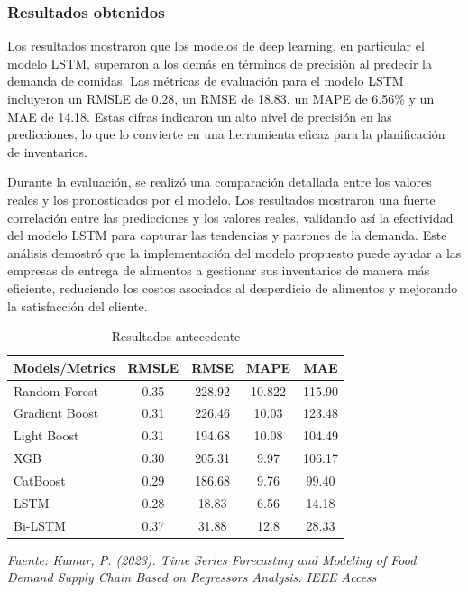 \subsubsection{Resultados obtenidos}
Los resultados mostraron que los modelos de deep learning, en particular el modelo LSTM, superaron a los demás en términos de precisión al predecir la demanda de comidas. Las métricas de evaluación para el modelo LSTM incluyeron un RMSLE de 0.28, un RMSE de 18.83, un MAPE de 6.56\% y un MAE de 14.18. Estas cifras indicaron un alto nivel de precisión en las predicciones, lo que lo convierte en una herramienta eficaz para la planificación de inventarios.

Durante la evaluación, se realizó una comparación detallada entre los valores reales y los pronosticados por el modelo. Los resultados mostraron una fuerte correlación entre las predicciones y los valores reales, validando así la efectividad del modelo LSTM para capturar las tendencias y patrones de la demanda. Este análisis demostró que la implementación del modelo propuesto puede ayudar a las empresas de entrega de alimentos a gestionar sus inventarios de manera más eficiente, reduciendo los costos asociados al desperdicio de alimentos y mejorando la satisfacción del cliente.

\begin{table}[h!]
	\centering
	\begin{tabular}{lcccc}
		\hline
		Models/Metrics & RMSLE & RMSE & MAPE & MAE \\ \hline
		 Random Forest & 0.35 &  228.92 & 10.822 & 115.90 \\
		 Gradient Boost & 0.31 & 226.46 & 10.03 & 123.48 \\
		 Light Boost & 0.31 & 194.68 & 10.08 & 104.49 \\
		 XGB & 0.30 & 205.31 & 9.97 & 106.17\\
		 CatBoost & 0.29 & 186.68 & 9.76 & 99.40 \\
		 LSTM & 0.28 & 18.83 & 6.56 & 14.18 \\
		 Bi-LSTM & 0.37 & 31.88 & 12.8 & 28.33 \\ \hline
		
	\end{tabular}
	\caption{Resultados antecedente}
	\textit{Fuente: Kumar, P. (2023). Time Series Forecasting and Modeling of Food Demand Supply Chain Based on Regressors Analysis. IEEE Access}
	
	\label{tabla:15}
\end{table}

